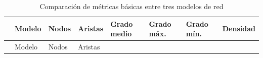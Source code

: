 \documentclass[
  letterpaper,
  DIV=11,
  numbers=noendperiod]{scrreprt}
\begin{document}
\begin{longtable}[]{@{}
  >{\raggedright\arraybackslash}p{}
  >{\raggedright\arraybackslash}p{}
  >{\raggedleft\arraybackslash}p{}
  >{\raggedleft\arraybackslash}p{}
  >{\raggedleft\arraybackslash}p{}
  >{\raggedleft\arraybackslash}p{}
  >{\raggedleft\arraybackslash}p{}
  >{\raggedleft\arraybackslash}p{}@{}}
\caption{Comparación de métricas básicas entre tres modelos de
red}\tabularnewline
\toprule\noalign{}
\begin{minipage}[b]{\linewidth}\raggedright
\end{minipage} & \begin{minipage}[b]{\linewidth}\raggedright
Modelo
\end{minipage} & \begin{minipage}[b]{\linewidth}\raggedleft
Nodos
\end{minipage} & \begin{minipage}[b]{\linewidth}\raggedleft
Aristas
\end{minipage} & \begin{minipage}[b]{\linewidth}\raggedleft
Grado medio
\end{minipage} & \begin{minipage}[b]{\linewidth}\raggedleft
Grado máx.
\end{minipage} & \begin{minipage}[b]{\linewidth}\raggedleft
Grado mín.
\end{minipage} & \begin{minipage}[b]{\linewidth}\raggedleft
Densidad
\end{minipage} \\
\midrule\noalign{}
\endfirsthead
\toprule\noalign{}
\begin{minipage}[b]{\linewidth}\raggedright
\end{minipage} & \begin{minipage}[b]{\linewidth}\raggedright
Modelo
\end{minipage} & \begin{minipage}[b]{\linewidth}\raggedleft
Nodos
\end{minipage} & \begin{minipage}[b]{\linewidth}\raggedleft
Aristas

\end{minipage}
\end{longtable}
\end{document}
